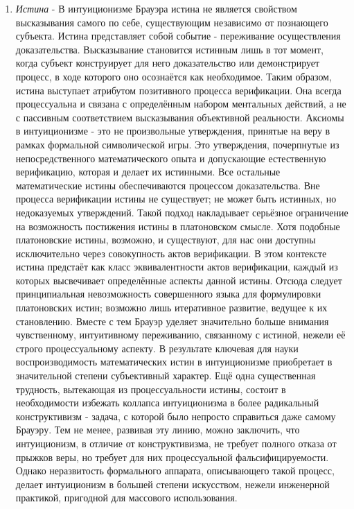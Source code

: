 \documentclass[12pt]{article}
\begin{document}
\begin{enumerate}
    \item {\it Истина} - В интуиционизме Брауэра истина не является свойством высказывания самого по себе, существующим независимо от познающего субъекта. Истина представляет собой событие - переживание осуществления доказательства. Высказывание становится истинным лишь в тот момент, когда субъект конструирует для него доказательство или демонстрирует процесс, в ходе которого оно осознаётся как необходимое. Таким образом, истина выступает атрибутом позитивного процесса верификации. Она всегда процессуальна и связана с определённым набором ментальных действий, а не с пассивным соответствием высказывания объективной реальности. Аксиомы в интуиционизме - это не произвольные утверждения, принятые на веру в рамках формальной символической игры. Это утверждения, почерпнутые из непосредственного математического опыта и допускающие естественную верификацию, которая и делает их истинными. Все остальные математические истины обеспечиваются процессом доказательства. Вне процесса верификации истины не существует; не может быть истинных, но недоказуемых утверждений. Такой подход накладывает серьёзное ограничение на возможность постижения истины в платоновском смысле. Хотя подобные платоновские истины, возможно, и существуют, для нас они доступны исключительно через совокупность актов верификации. В этом контексте истина предстаёт как класс эквивалентности актов верификации, каждый из которых высвечивает определённые аспекты данной истины. Отсюда следует принципиальная невозможность совершенного языка для формулировки платоновских истин; возможно лишь итеративное развитие, ведущее к их становлению. Вместе с тем Брауэр уделяет значительно больше внимания чувственному, интуитивному переживанию, связанному с истиной, нежели её строго процессуальному аспекту. В результате ключевая для науки воспроизводимость математических истин в интуиционизме приобретает в значительной степени субъективный характер. Ещё одна существенная трудность, вытекающая из процессуальности истины, состоит в необходимости избежать коллапса интуиционизма в более радикальный конструктивизм - задача, с которой было непросто справиться даже самому Брауэру. Тем не менее, развивая эту линию, можно заключить, что интуиционизм, в отличие от конструктивизма, не требует полного отказа от прыжков веры, но требует для них процессуальной фальсифицируемости. Однако неразвитость формального аппарата, описывающего такой процесс, делает интуиционизм в большей степени искусством, нежели инженерной практикой, пригодной для массового использования.

\end{enumerate}
\end{document}
